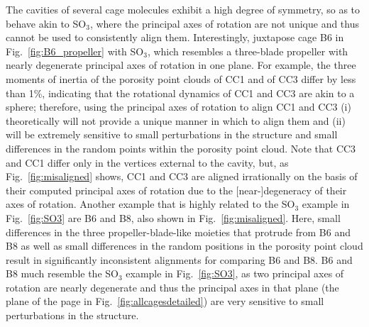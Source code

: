 \documentclass[journal=jacsat,manuscript=article]{achemso}
\begin{document}
{The cavities of several cage molecules exhibit a high degree of symmetry, so as to behave akin to SO$_3$, where the principal axes of rotation are not unique and thus cannot be used to consistently align them. Interestingly, juxtapose cage B6 in Fig.~\ref{fig:B6_propeller} with SO$_3$, which resembles a three-blade propeller \cite{peraire2008lecture} with nearly degenerate principal axes of rotation in one plane. For example, the three moments of inertia of the porosity point clouds of CC1 and of CC3 differ by less than 1\%, indicating that the rotational dynamics of CC1 and CC3 are akin to a sphere; therefore, using the principal axes of rotation to align CC1 and CC3 (i) theoretically will not provide a unique manner in which to align them and (ii) will be extremely sensitive to small perturbations in the structure and small differences in the random points within the porosity point cloud. Note that CC3 and CC1 differ only in the vertices external to the cavity, but, as Fig.~\ref{fig:misaligned} shows, CC1 and CC3 are aligned irrationally on the basis of their computed principal axes of rotation due to the [near-]degeneracy of their axes of rotation. Another example that is highly related to the SO$_3$ example in Fig.~\ref{fig:SO3} are B6 and B8, also shown in Fig.~\ref{fig:misaligned}. Here, small differences in the three propeller-blade-like moieties that protrude from B6 and B8 as well as small differences in the random positions in the porosity point cloud result in significantly inconsistent alignments for comparing B6 and B8. B6 and B8 much resemble the SO$_3$ example in Fig.~\ref{fig:SO3}, as two principal axes of rotation are nearly degenerate and thus the principal axes in that plane (the plane of the page in Fig.~\ref{fig:allcagesdetailed}) are very sensitive to small perturbations in the structure.

}
\end{document}
